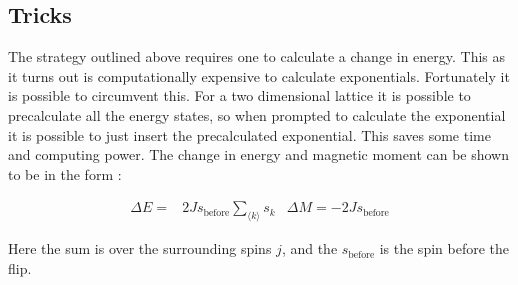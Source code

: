 \begin{comment}
For fun, a simple flow chart of the operations was made, mainly to help my understanding, is given below.

\begin{tikzpicture}[node distance = 2cm, auto]
\node [block] (init) {initialize model};
\node [block, below of=init] (identify) {Choose one spin at random};
\node [block, below of=identify] (evaluate) {Calculate the new energy};
\node [block, left of=evaluate, node distance=3cm] (update) {Is the energy greater then a RNG value?};
\node [decision, below of=evaluate] (decide) {Is $\Delta E$ negative?};
\node [block, below of=decide, node distance=3cm] (stop) {Flip spin};
\node [block, below of=stop, node distance=2cm] (finnished) {Update expectation value};
\path [line] (init) -- (identify);
\path [line] (identify) -- (evaluate);
\path [line] (evaluate) -- (decide);
\path [line] (decide) -| node [near start] {no} (update);
\path [line] (update) -| node [near start] {yes} (stop);
\path [line] (update) |- node {no} (identify);
\path [line] (decide) -- node {yes}(stop);
\path [line] (stop) -- (finnished);
\end{tikzpicture}
\end{comment}




\subsection{Tricks}

The strategy outlined above requires one to calculate a change in energy. This as it turns out is computationally expensive to calculate exponentials. Fortunately it is possible to circumvent this. For a two dimensional lattice it is possible to precalculate all the energy states, so when prompted to calculate the exponential it is possible to just insert the precalculated exponential. This saves some time and computing power. The change in energy and magnetic moment can be shown to be in the form \cite{compphys}:

\begin{align*}
	\Delta E=&2Js_{\text{before}}\sum_{\langle k\rangle}s_k&\Delta M=-2Js_{\text{before}}
\end{align*}

Here the sum is over the surrounding spins $j$, and the $s_{\text{before}}$ is the spin before the flip.














